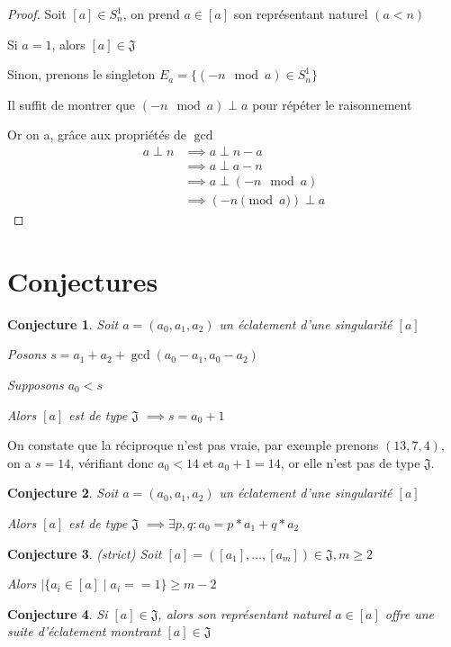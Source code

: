 \documentclass{article}
\newtheorem{conjecture}{Conjecture}
\begin{document}
\begin{proof}
    Soit $[a] \in S_n^1$, on prend $a \in [a]$ son représentant naturel $(a < n)$

    Si $a = 1$, alors $[a] \in \mathfrak{J}$

    Sinon, prenons le singleton $E_a = \{ (-n \mod a) \in S_n^1 \}$

    Il suffit de montrer que $(-n \mod a) \perp a$ pour répéter le raisonnement

    Or on a, grâce aux propriétés de $\gcd$
    \begin{align*}
        a \perp n &\implies a \perp n - a \\
        &\implies a \perp a - n \\
        &\implies a \perp (-n \mod a) \\
        &\implies (-n \pmod a) \perp a
    \end{align*}
\end{proof}

\section{Conjectures}

\begin{conjecture}
    Soit $a=(a_0, a_1, a_2)$ un éclatement d'une singularité $[a]$

    Posons $s = a_1 + a_2 + \gcd(a_0-a_1, a_0-a_2)$

    Supposons $a_0 < s$

    Alors $[a]$ est de type $\mathfrak{J}$ $\implies s = a_0 + 1$
\end{conjecture}

On constate que la réciproque n'est pas vraie, par exemple prenons $(13, 7, 4)$, on a $s = 14$, vérifiant donc $a_0 < 14$ et $a_0 + 1 = 14$, or elle n'est pas de type $\mathfrak{J}$.

\begin{conjecture}
    Soit $a=(a_0, a_1, a_2)$ un éclatement d'une singularité $[a]$

    Alors $[a]$ est de type $\mathfrak{J}$ $\implies \exists p, q: a_0 = p*a_1 + q*a_2$
\end{conjecture}

\begin{conjecture}
    (strict) Soit $[a] = ([a_1], \dots, [a_m]) \in \mathfrak{J}, m \geq 2$

    Alors $|\{ a_i \in [a] \mid a_i == 1 \} \geq m - 2$
\end{conjecture}

\begin{conjecture}
    Si $[a] \in \mathfrak{J}$, alors son représentant naturel $a \in [a]$ offre une suite d'éclatement montrant $[a] \in \mathfrak{J}$
\end{conjecture}
\end{document}
